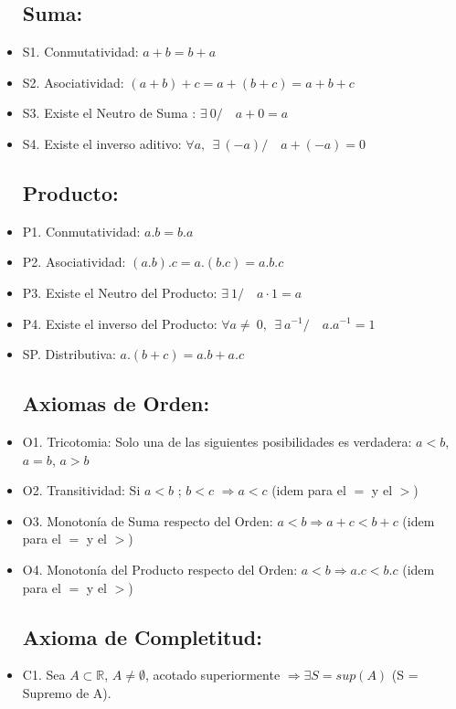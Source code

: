 \documentclass[a4paper,11pt,spanish,sans]{exam}
\begin{document}
	\begin{itemize}
		\subsection*{Suma:}
		
		\item S1. Conmutatividad: $a+b=b+a$ 
		\item S2. Asociatividad: $(a+b)+c=a+(b+c)=a+b+c$ 
		\item S3. Existe el Neutro de Suma : $\exists \: 0/ \quad a + 0=a$ 
		\item S4. Existe el inverso aditivo: $\forall a, \: \: \exists \: (-a) / \quad a + (-a)=0$ 
		
		
		\subsection*{Producto:}
		\item P1. Conmutatividad: $a.b=b.a$ 
		\item P2. Asociatividad: $(a.b).c=a.(b.c)=a.b.c$ 
		\item P3. Existe el Neutro del Producto: $\exists \: 1/ \quad a \cdot 1=a$  
		\item P4. Existe el inverso del Producto: $\forall a\neq \: 0, \: \: \exists \:  a^{-1} / \quad a.a^{-1}=1$   \\
		
		\item SP. Distributiva: $a.(b+c)=a.b+a.c$
		
		\subsection*{Axiomas de Orden:}
		\item O1. Tricotomia: Solo una de las siguientes posibilidades es verdadera: $a<b$, $a=b$, $a>b$
		\item O2. Transitividad: Si $a<b$ ; $b<c$ $\Rightarrow a<c$ (idem para el $=$ y el $>$)
		\item O3. Monotonía de Suma respecto del Orden: $a<b \Rightarrow a+c<b+c$ (idem para el $=$ y el $>$)
		\item O4. Monotonía del Producto respecto del Orden: $a<b \Rightarrow a.c<b.c$ (idem para el $=$ y el $>$)
		
		\subsection*{Axioma de Completitud:}
		\item C1. Sea $A \subset \mathbb{R} $, $A\neq \emptyset$, acotado superiormente $\Rightarrow \exists S=sup(A)$ (S = Supremo de A).
	\end{itemize}
\end{document}
